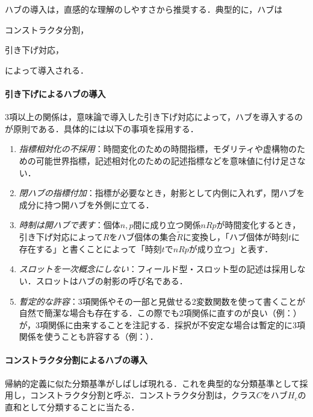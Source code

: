 \documentclass[../../main-detail.tex]{subfiles}
\begin{document}
ハブの導入は，直感的な理解のしやすさから推奨する．典型的に，ハブは
\begin{enumerate*}
    \item コンストラクタ分割，
    \item 引き下げ対応，
\end{enumerate*}
によって導入される．

\paragraph{引き下げによるハブの導入} 3項以上の関係は，意味論で導入した引き下げ対応によって，ハブを導入するのが原則である．具体的には以下の事項を採用する．
\begin{enumerate}
    \item \emph{指標相対化の不採用}：時間変化のための時間指標，モダリティや虚構物のための可能世界指標，記述相対化のための記述指標などを意味値に付け足さない．
    \item \emph{閉ハブの指標付加}：指標が必要なとき，射影として内側に入れず，閉ハブを成分に持つ開ハブを外側に立てる．
    \item \emph{時制は開ハブで表す}：個体$n,p$間に成り立つ関係$nRp$が時間変化するとき，引き下げ対応によって$R$をハブ個体の集合$\tilde{R}$に変換し，「ハブ個体が時刻$t$に存在する」と書くことによって「時刻$t$で$nRp$が成り立つ」と表す．
    \item \emph{スロットを一次概念にしない}：フィールド型・スロット型の記述は採用しない．スロットはハブの射影の呼び名である．
    \item \emph{暫定的な許容}：3項関係やその一部と見做せる2変数関数を使って書くことが自然で簡潔な場合も存在する．この際でも2項関係に直すのが良い（例：）が，3項関係に由来することを注記する．採択が不安定な場合は暫定的に3項関係を使うことも許容する（例：）．
\end{enumerate}

\paragraph{コンストラクタ分割によるハブの導入} 帰納的定義に似た分類基準がしばしば現れる．これを典型的な分類基準として採用し，コンストラクタ分割と呼ぶ．コンストラクタ分割は，クラス$C$をハブ$H_c$の直和として分類することに当たる．
\end{document}
